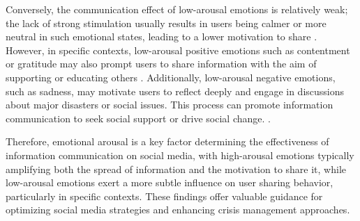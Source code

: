 Conversely, the communication effect of low-arousal emotions is relatively weak; the lack of strong stimulation usually results in users being calmer or more neutral in such emotional states, leading to a lower motivation to share \cite{son2022emotion}. However, in specific contexts, low-arousal positive emotions such as contentment or gratitude may also prompt users to share information with the aim of supporting or educating others \cite{stieglitz2013emotions}. Additionally, low-arousal negative emotions, such as sadness, may motivate users to reflect deeply and engage in discussions about major disasters or social issues. This process can promote information communication to seek social support or drive social change. \cite{de2021sadness}.

Therefore, emotional arousal is a key factor determining the effectiveness of information communication on social media, with high-arousal emotions typically amplifying both the spread of information and the motivation to share it, while low-arousal emotions exert a more subtle influence on user sharing behavior, particularly in specific contexts. These findings offer valuable guidance for optimizing social media strategies and enhancing crisis management approaches.


